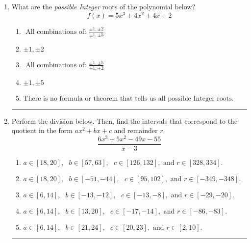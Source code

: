 \documentclass[14pt]{extbook}
\newcommand{\litem}[1]{\item#1\hspace*{-1cm}\rule{\textwidth}{0.4pt}}
\begin{document}
\begin{enumerate}
{\begin{enumerate}[label=\Alph*.]
\end{enumerate} }
\litem{
What are the \textit{possible Integer} roots of the polynomial below?\[ f(x) = 5x^{3} +4 x^{2} +4 x + 2 \]\begin{enumerate}[label=\Alph*.]
\item \( \text{ All combinations of: }\frac{\pm 1,\pm 2}{\pm 1,\pm 5} \)
\item \( \pm 1,\pm 2 \)
\item \( \text{ All combinations of: }\frac{\pm 1,\pm 5}{\pm 1,\pm 2} \)
\item \( \pm 1,\pm 5 \)
\item \( \text{There is no formula or theorem that tells us all possible Integer roots.} \)

\end{enumerate} }
\litem{
Perform the division below. Then, find the intervals that correspond to the quotient in the form $ax^2+bx+c$ and remainder $r$.\[ \frac{6x^{3} +5 x^{2} -49 x -55}{x -3} \]\begin{enumerate}[label=\Alph*.]
\item \( a \in [18, 20], \text{   } b \in [57, 63], \text{   } c \in [126, 132], \text{   and   } r \in [328, 334]. \)
\item \( a \in [18, 20], \text{   } b \in [-51, -44], \text{   } c \in [95, 102], \text{   and   } r \in [-349, -348]. \)
\item \( a \in [6, 14], \text{   } b \in [-13, -12], \text{   } c \in [-13, -8], \text{   and   } r \in [-29, -20]. \)
\item \( a \in [6, 14], \text{   } b \in [13, 20], \text{   } c \in [-17, -14], \text{   and   } r \in [-86, -83]. \)
\item \( a \in [6, 14], \text{   } b \in [21, 24], \text{   } c \in [20, 23], \text{   and   } r \in [2, 10]. \)

\end{enumerate} }
\end{enumerate}
\end{document}
